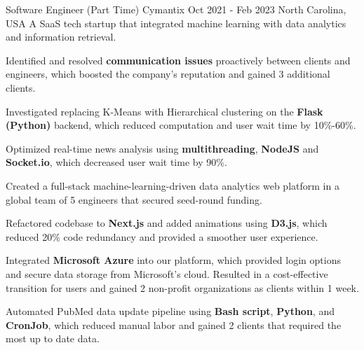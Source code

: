 \begin{cventries}
    \cventry
    {Software Engineer (Part Time)} %
    {Cymantix} %
    {Oct 2021 - Feb 2023} %
    {North Carolina, USA} %
    {A SaaS tech startup that integrated machine learning with data analytics and information retrieval.}
    {
      \begin{cvitems} %
        \item {Identified and resolved \textbf{communication issues} proactively between clients and engineers, which boosted the company's reputation and gained 3 additional clients.}
        \item {Investigated replacing K-Means with Hierarchical clustering on the \textbf{Flask (Python)} backend, which reduced computation and user wait time by 10\%-60\%.}
        \item {Optimized real-time news analysis using \textbf{multithreading}, \textbf{NodeJS} and \textbf{Socket.io}, which decreased user wait time by 90\%.}
        \item {Created a full-stack machine-learning-driven data analytics web platform in a global team of 5 engineers that secured seed-round funding.}
        \item {Refactored codebase to \textbf{Next.js} and added animations using \textbf{D3.js}, which reduced 20\% code redundancy and provided a smoother user experience.}
        \item {Integrated \textbf{Microsoft Azure} into our platform, which provided login options and secure data storage from Microsoft's cloud. Resulted in a cost-effective transition for users and gained 2 non-profit organizations as clients within 1 week.}
        \item {Automated PubMed data update pipeline using \textbf{Bash script}, \textbf{Python}, and \textbf{CronJob}, which reduced manual labor and gained 2 clients that required the most up to date data.}
      \end{cvitems}
    }


\end{cventries}
